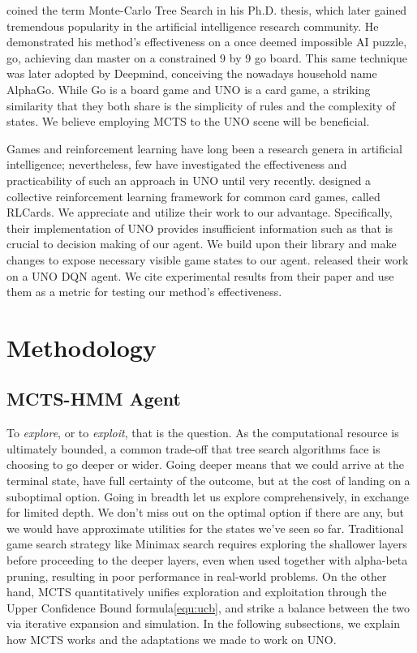 \documentclass{article}
\begin{document}
\citeauthor{chaslot2010monte}  coined the term Monte-Carlo Tree Search in his Ph.D. thesis, which later gained tremendous popularity in the artificial intelligence research community. He demonstrated his method's effectiveness on a once deemed impossible AI puzzle, go, achieving dan master on a constrained 9 by 9 go board. This same technique was later adopted by Deepmind, conceiving the nowadays household name AlphaGo. While Go is a board game and UNO is a card game, a striking similarity that they both share is the simplicity of rules and the complexity of states. We believe employing MCTS to the UNO scene will be beneficial.

Games and reinforcement learning have long been a research genera in artificial intelligence; nevertheless, few have investigated the effectiveness and practicability of such an approach in UNO until very recently. \citeauthor{zha2019rlcard} designed a collective reinforcement learning framework for common card games, called RLCards. We appreciate and utilize their work to our advantage. Specifically, their implementation of UNO provides insufficient information such as \todo{} that is crucial to decision making of our \todo{} agent. We build upon their library and make changes to expose necessary visible game states to our agent. \citeauthor{olivia2020winning} released their work on a UNO DQN agent. We cite experimental results from their paper and use them as a metric for testing our method's effectiveness.


\section{Methodology}
\subsection{MCTS-HMM Agent}
To \textit{explore}, or to \textit{exploit}, that is the question. As the computational resource is ultimately bounded, a common trade-off that tree search algorithms face is choosing to go deeper or wider. Going deeper means that we could arrive at the terminal state, have full certainty of the outcome, but at the cost of landing on a suboptimal option. Going in breadth let us explore comprehensively, in exchange for limited depth. We don't miss out on the optimal option if there are any, but we would have approximate utilities for the states we've seen so far. Traditional game search strategy like Minimax search requires exploring the shallower layers before proceeding to the deeper layers, even when used together with alpha-beta pruning, resulting in poor performance in real-world problems. On the other hand, MCTS quantitatively unifies exploration and exploitation through the Upper Confidence Bound formula\ref{equ:ucb}, and strike a balance between the two via iterative expansion and simulation. In the following subsections, we explain how MCTS works and the adaptations we made to work on UNO.
\end{document}
